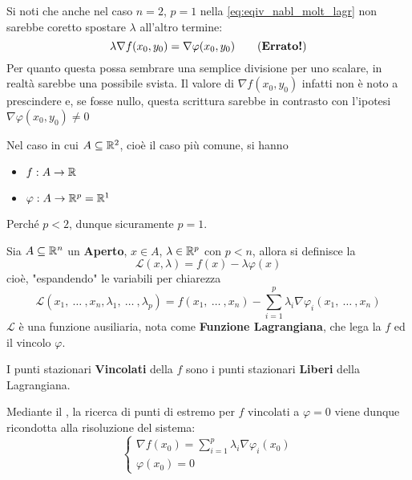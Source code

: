 \begin{observation}
	Si noti che anche nel caso $n = 2$, $p = 1$ nella \cref{eq:eqiv_nabl_molt_lagr} non sarebbe coretto spostare $\lambda$ all'altro termine:
	\[\lambda \nabla f(x_0, y_0) = \nabla \varphi (x_0, y_0) \tag{\textbf{Errato!}}\]
	Per quanto questa possa sembrare una semplice divisione per uno scalare, in realtà sarebbe una possibile svista. Il valore di $\nabla f(x_0,y_0)$ infatti non è noto a prescindere e, se fosse nullo, questa scrittura sarebbe in contrasto con l'ipotesi $\nabla \varphi(x_0,y_0) \neq 0$
\end{observation}
\begin{example}
	\label{ex:max_min_vinc_n2_p1}
	Nel caso in cui $A \subseteq \mathbb{R}^2$, cioè il caso più comune, si hanno
	\begin{itemize}[noitemsep]
		\item $f: A \to \mathbb{R}$
		\item $\varphi: A \to \mathbb{R}^p = \mathbb{R}^1$
	\end{itemize}
	Perché $p < 2$, dunque sicuramente $p = 1$.
\end{example}
\cbstart
\begin{definition}[Funzione Lagrangiana] %
	\label{def:funz_lagr}
	Sia $A \subseteq \mathbb{R}^n$ un \textbf{Aperto}, $x \in A$, $\lambda \in \mathbb{R}^p$ con $p < n$, allora si definisce la
	\[\mathcal{L}(x, \lambda) = f(x) - \lambda \varphi(x)\]
	cioè, "espandendo" le variabili per chiarezza
	\[\mathcal{L}(x_1,\:\dotsc\:,x_n, \lambda_1,\:\dotsc\:,\lambda_p) = f(x_1,\:\dotsc\:,x_n) - \sum\limits_{i = 1}^{p} \lambda_i \nabla \varphi_i (x_1,\:\dotsc\:,x_n)\]
	$\mathcal{L}$ è una funzione ausiliaria, nota come \textbf{Funzione Lagrangiana}, che lega la $f$ ed il vincolo $\varphi$.

	\noindent I punti stazionari \textbf{Vincolati} della $f$ sono i punti stazionari \textbf{Liberi} della Lagrangiana.
\end{definition}
\cbend
\begin{observation}
	\label{obs:sist_eqiv_lagr}
	Mediante il , la ricerca di punti di estremo per $f$ vincolati a $\varphi = 0$ viene dunque ricondotta alla risoluzione del sistema:
	\begin{equation}
		\label{eq:teo_molt_lagr_gen_sist_varphi}
		\begin{cases}
			\nabla f(x_0) = \sum\limits_{i = 1}^{p} \lambda_i \nabla \varphi_i (x_0)\\
			\varphi(x_0) = 0
		\end{cases}
	\end{equation}
\end{observation}
